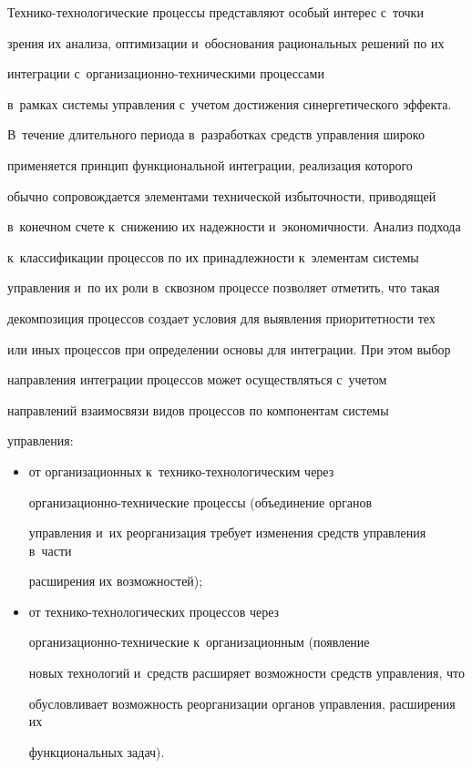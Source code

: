   

  

  Технико-технологические процессы представляют особый интерес с~точки 

зрения их анализа, оптимизации и~обоснования рациональных решений по их 

интеграции с~ор\-га\-ни\-за\-ци\-он\-но-тех\-ни\-че\-ски\-ми процессами 

в~рамках системы управления с~учетом достижения синергетического эффекта. 

В~течение длительного периода в~разработках средств управления широко 

применяется принцип функциональной интеграции, реализация которого 

обычно сопровождается элементами технической избыточности, приводящей 

в~конечном счете к~снижению их надежности и~экономичности. Анализ подхода 

к~классификации процессов по их принадлежности к~элементам системы 

управления и~по их роли в~сквозном процессе позволяет отметить, что такая 

декомпозиция процессов создает условия для выявления приоритетности тех 

или иных процессов при определении основы для интеграции. При этом выбор 

направления интеграции процессов может осуществляться с~учетом 

направлений взаимосвязи видов процессов по компонентам системы 

управления:

  \begin{itemize}

  \item от организационных к~технико-технологическим через  

ор\-га\-ни\-за\-ци\-он\-но-тех\-ни\-че\-ские процессы (объединение органов 

управления и~их реорганизация требует изменения средств управления в~части 

расширения их возможностей);

  \item от технико-технологических процессов через  

ор\-га\-ни\-за\-ци\-он\-но-тех\-ни\-че\-ские к~организационным (появление 

новых технологий и~средств расширяет возможности средств управления, что 

обусловливает возможность реорганизации органов управления, расширения их 

функциональных задач).

  \end{itemize}

